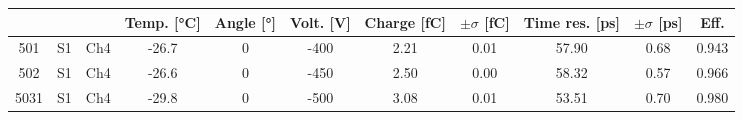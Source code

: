 \begin{tabular}{ccccccccccc}
\toprule
 &  &  & Temp. [°C] & Angle [°] & Volt. [V] & Charge [fC] & \(\pm\sigma\) [fC] & Time res. [ps] & \(\pm\sigma\) [ps] & Eff. \\
\midrule
501 & S1 & Ch4 & -26.7 & 0 & -400 & 2.21 & 0.01 & 57.90 & 0.68 & 0.943 \\
502 & S1 & Ch4 & -26.6 & 0 & -450 & 2.50 & 0.00 & 58.32 & 0.57 & 0.966 \\
5031 & S1 & Ch4 & -29.8 & 0 & -500 & 3.08 & 0.01 & 53.51 & 0.70 & 0.980 \\
\bottomrule
\end{tabular}
